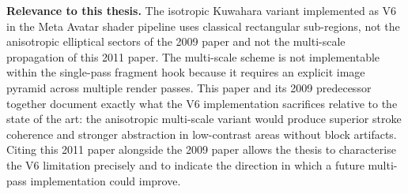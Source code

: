 \documentclass[11pt, a4paper]{article}
\begin{document}
\textbf{Relevance to this thesis.} The isotropic Kuwahara variant implemented as V6 in the Meta Avatar shader pipeline uses classical rectangular sub-regions, not the anisotropic elliptical sectors of the 2009 paper and not the multi-scale propagation of this 2011 paper. The multi-scale scheme is not implementable within the single-pass fragment hook because it requires an explicit image pyramid across multiple render passes. This paper and its 2009 predecessor together document exactly what the V6 implementation sacrifices relative to the state of the art: the anisotropic multi-scale variant would produce superior stroke coherence and stronger abstraction in low-contrast areas without block artifacts. Citing this 2011 paper alongside the 2009 paper allows the thesis to characterise the V6 limitation precisely and to indicate the direction in which a future multi-pass implementation could improve.
\end{document}
